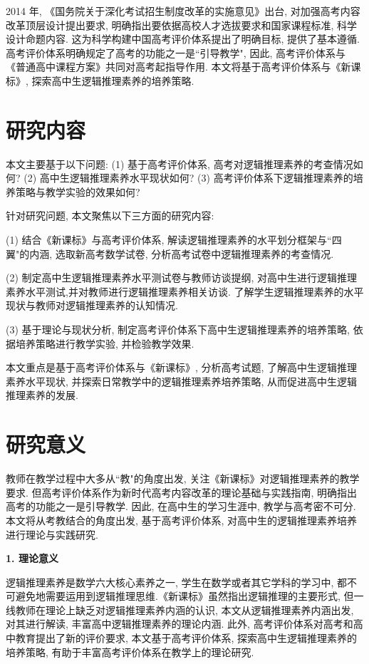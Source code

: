 \documentclass[acaddeg]{Style/SCNUThesisV3}
\begin{document}
2014 年, 《国务院关于深化考试招生制度改革的实施意见》出台, 对加强高考内容改革顶层设计提出要求, 明确指出要依据高校人才选拔要求和国家课程标准, 科学设计命题内容. 这为科学构建中国高考评价体系提出了明确目标, 提供了基本遵循. 高考评价体系明确规定了高考的功能之一是``引导教学", 因此, 高考评价体系与《普通高中课程方案》共同对高考起指导作用.  本文将基于高考评价体系与《新课标》, 探索高中生逻辑推理素养的培养策略.

 \section{研究内容}
 本文主要基于以下问题: (1) 基于高考评价体系, 高考对逻辑推理素养的考查情况如何? (2) 高中生逻辑推理素养水平现状如何? (3) 高考评价体系下逻辑推理素养的培养策略与教学实验的效果如何? 
 
 针对研究问题, 本文聚焦以下三方面的研究内容: 
 
 (1) 结合《新课标》与高考评价体系, 解读逻辑推理素养的水平划分框架与``四翼"的内涵, 选取新高考数学试卷, 分析高考试卷中逻辑推理素养的考查情况.
 
 (2) 制定高中生逻辑推理素养水平测试卷与教师访谈提纲, 对高中生进行逻辑推理素养水平测试,并对教师进行逻辑推理素养相关访谈. 了解学生逻辑推理素养的水平现状与教师对逻辑推理素养的认知情况.
 
 (3) 基于理论与现状分析, 制定高考评价体系下高中生逻辑推理素养的培养策略, 依据培养策略进行教学实验, 并检验教学效果. 
 
 本文重点是基于高考评价体系与《新课标》, 分析高考试题, 了解高中生逻辑推理素养水平现状, 并探索日常教学中的逻辑推理素养培养策略, 从而促进高中生逻辑推理素养的发展.
 
 
 \section{研究意义}
教师在教学过程中大多从``教"的角度出发, 关注《新课标》对逻辑推理素养的教学要求. 但高考评价体系作为新时代高考内容改革的理论基础与实践指南, 明确指出高考的功能之一是引导教学. 因此, 在高中生的学习生涯中, 教学与高考密不可分. 本文将从考教结合的角度出发, 基于高考评价体系, 对高中生的逻辑推理素养培养进行理论与实践研究. 
  
 \textbf{1. 理论意义}
 
逻辑推理素养是数学六大核心素养之一, 学生在数学或者其它学科的学习中, 都不可避免地需要运用到逻辑推理思维.《新课标》虽然指出逻辑推理的主要形式, 但一线教师在理论上缺乏对逻辑推理素养内涵的认识, 本文从逻辑推理素养内涵出发, 对其进行解读, 丰富高中逻辑推理素养的理论内涵. 此外, 高考评价体系对高考和高中教育提出了新的评价要求, 本文基于高考评价体系, 探索高中生逻辑推理素养的培养策略, 有助于丰富高考评价体系在教学上的理论研究. 
 
\end{document}
